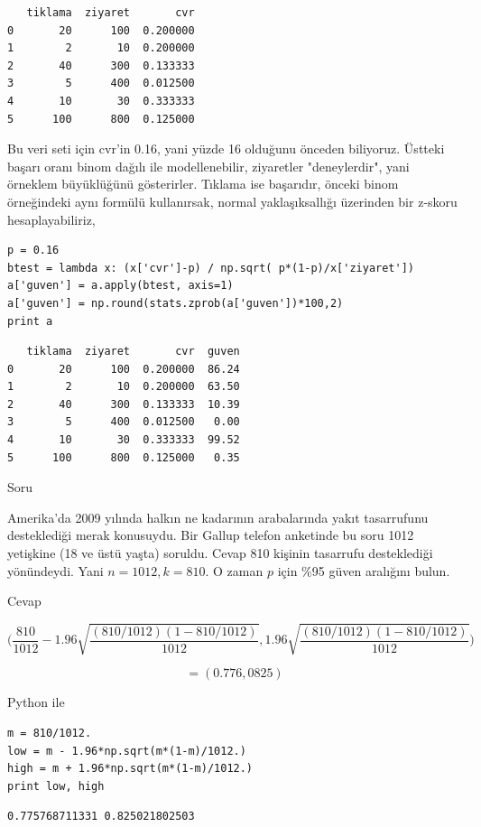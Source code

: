 \documentclass[12pt,fleqn]{article}\usepackage{../../common}
\begin{document}
\begin{verbatim}
   tiklama  ziyaret       cvr
0       20      100  0.200000
1        2       10  0.200000
2       40      300  0.133333
3        5      400  0.012500
4       10       30  0.333333
5      100      800  0.125000
\end{verbatim}

Bu veri seti için cvr'in 0.16, yani yüzde 16 olduğunu önceden biliyoruz. Üstteki
başarı oranı binom dağılı ile modellenebilir, ziyaretler "deneylerdir", yani
örneklem büyüklüğünü gösterirler. Tıklama ise başarıdır, önceki binom
örneğindeki aynı formülü kullanırsak, normal yaklaşıksallığı üzerinden bir
z-skoru hesaplayabiliriz,

\begin{verbatim}
p = 0.16
btest = lambda x: (x['cvr']-p) / np.sqrt( p*(1-p)/x['ziyaret'])
a['guven'] = a.apply(btest, axis=1)
a['guven'] = np.round(stats.zprob(a['guven'])*100,2)
print a
\end{verbatim}

\begin{verbatim}
   tiklama  ziyaret       cvr  guven
0       20      100  0.200000  86.24
1        2       10  0.200000  63.50
2       40      300  0.133333  10.39
3        5      400  0.012500   0.00
4       10       30  0.333333  99.52
5      100      800  0.125000   0.35
\end{verbatim}

Soru 

Amerika'da 2009 yılında halkın ne kadarının arabalarında yakıt tasarrufunu
desteklediği merak konusuydu. Bir Gallup telefon anketinde bu soru 1012
yetişkine (18 ve üstü yaşta) soruldu. Cevap 810 kişinin tasarrufu
desteklediği yönündeydi. Yani $n=1012,k=810$. O zaman $p$ için \%95 güven
aralığını bulun.

Cevap 

$$ \bigg(
\frac{810}{1012}
-1.96 \sqrt{ \frac{(810/1012)(1-810/1012)}{1012} } ,
1.96  \sqrt{ \frac{(810/1012)(1-810/1012)}{1012} }
\bigg)
$$

$$ = (0.776,0825) $$

Python ile

\begin{verbatim}
m = 810/1012.
low = m - 1.96*np.sqrt(m*(1-m)/1012.)
high = m + 1.96*np.sqrt(m*(1-m)/1012.)
print low, high
\end{verbatim}

\begin{verbatim}
0.775768711331 0.825021802503
\end{verbatim}
\end{document}
